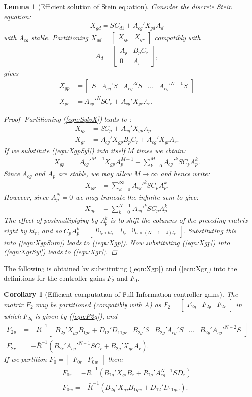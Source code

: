 \documentclass[a4paper,12pt]{article}
\newtheorem{cor}[thm]{Corollary}
\newtheorem{lem}[thm]{Lemma}
\theoremstyle{remark}
\newcommand{\ma}[1]{\begin{bmatrix} #1 \end{bmatrix}}
\newcommand{\als}[1]{\begin{align*} #1 \end{align*}}
\newcommand{\aln}[1]{\begin{align} #1 \end{align}}
\begin{document}
\begin{lem}[Efficient solution of Stein equation]
\label{lem:SylvRecurs}
Consider the discrete Stein equation:
\aln{
X_{gd}=SC_{d1}+A_{cg}'X_{gd}A_d \label{eqn:SylvX}
}
with $A_{cg}$ stable. Partitioning   $X_{gd}=\ma{X_{gp} & X_{gr}}$ compatibly with  
\als{A_d=\ma{A_p & B_pC_r\\0& A_r},}
gives
\aln{
X_{gp}&= \ma{S &A_{cg}'S & {A_{cg}'}^2S & \ldots&{A_{cg}'}^{N-1}S }\label{eqn:Xgp}\\ 
X_{gr}&={A_{cg}'}^{N}SC_r+A_{cg}'X_{gr}A_r \label{eqn:Xgr}.
}

\begin{proof}
Partitioning (\ref{eqn:SylvX}) leads to :
\aln{
X_{gp}&=SC_p+A_{cg}'X_{gp}A_p  \label{eqn:XgpSyl}\\
X_{gr}&=A_{cg}'X_{gp}B_pC_r+A_{cg}'X_{gr}A_r.  \label{eqn:XgrSyl}
}
%
If we substitute (\ref{eqn:XgpSyl}) into itself $M$ times we obtain:
\als{
X_{gp}&=  {A_{cg}'}^{M+1} X_{gp} A_p^{M+1}+\sum_{k=0}^{M} {A_{cg}'}^k SC_p A_p^k.
}
Since $A_{cg}$ and $A_p$ are stable, we may allow $M\rightarrow \infty$  and hence write:
\als{
X_{gp}&= \sum_{k=0}^{\infty} {A_{cg}'}^k SC_p A_p^k.
}
However, since $A_p^N=0$ we may truncate the infinite sum to give:
\aln{
X_{gp}&= \sum_{k=0}^{N-1} {A_{cg}'}^k SC_p A_p^k.\label{eqn:XgpSum}
}
The effect of postmultiplying by $A_p^k$ is to shift the columns of the preceding matrix right by $kl_r$, and so $C_pA_p^k=\ma{0_{l_r\times kl_r} &I_{l_r}&0_{l_r\times (N-1-k)l_r }}$. Substituting this into (\ref{eqn:XgpSum}) leads to (\ref{eqn:Xgp}). Now substituting (\ref{eqn:Xgp}) into (\ref{eqn:XgrSyl}) leads to (\ref{eqn:Xgr}).
\end{proof}
\end{lem}

The following is obtained by substituting (\ref{eqn:Xgp}) and (\ref{eqn:Xgr}) into the definitions for the controller gains $F_2$ and $F_0$.

\begin{cor}[Efficient computation of Full-Information controller gains]
The matrix $F_2$ may be partitioned (compatibly with $A$) as $F_2=\ma{F_{2g}&F_{2p}&F_{2r}}$ in which $F_{2g}$ is given by (\ref{eqn:F2g}), and 
\aln{
F_{2p}&=-{\bar R}^{-1}\ma{B_{2g}'X_{gg}B_{1gr}+D_{12}'D_{11gr} & B_{2g}'S & B_{2g}'A_{cg}'S& \ldots & B_{2g}'{A_{cg}'}^{N-2}S}\label{eqn:F2pEff}\\
F_{2r}&=-{\bar R}^{-1}\left(  B_{2g}'{A_{cg}'}^{N-1}SC_r+B_{2g}'X_{gr}A_r \right)\label{eqn:F2rEff}
.}
If we partition $F_0=\ma{F_{0r}& F_{0w}}$ then:
\aln{
F_{0r}=-{\bar R}^{-1}\left(  B_{2g}'X_{gr}B_r+B_{2g}'A_{cg}^{N-1}SD_r \right)\label{eqn:F0reff}\\
F_{0w}=-{\bar R}^{-1}\left(  B_{2g}'X_{gg}B_{1gw}+D_{12}'D_{11gw} \right)\label{eqn:F0w}
.}
\end{cor}
\end{document}
